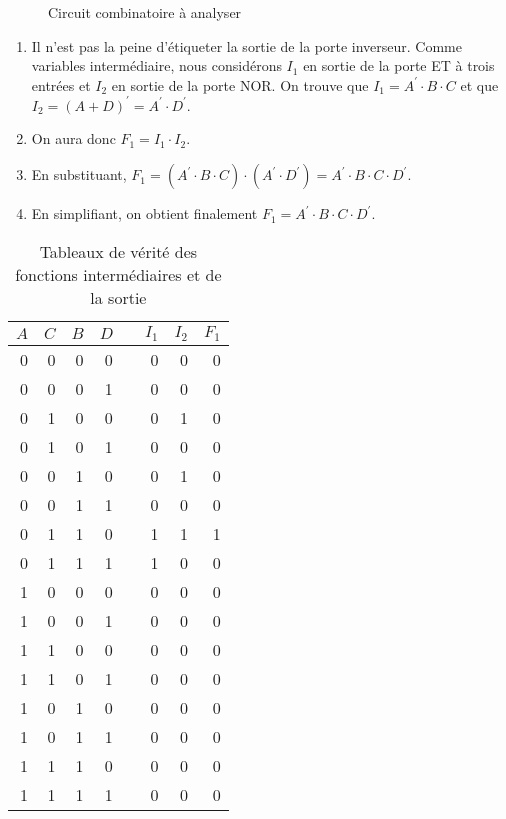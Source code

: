 \documentclass[11pt]{article}
\begin{document}
\begin{figure}[htbp]
\centering

\caption{\label{fig:org4205ee8}Circuit combinatoire à analyser}
\end{figure}

\begin{enumerate}
\item Il n'est pas la peine d'étiqueter la sortie de la porte
inverseur. Comme variables intermédiaire, nous considérons \(I_1\)
en sortie de la porte ET à trois entrées et \(I_2\) en sortie de la
porte NOR. On trouve que \(I_1 = A^\prime \cdot B \cdot C\) et que
\(I_2 = (A + D)^\prime = A^\prime \cdot D^\prime\).

\item On aura donc \(F_1 = I_1 \cdot I_2\).

\item En substituant, \(F_1 = ( A^\prime \cdot B \cdot C ) \cdot (
   A^\prime \cdot D^\prime) = A^\prime \cdot B \cdot C \cdot
   D^\prime\).

\item En simplifiant, on obtient finalement \(F_1 = A^\prime \cdot B
   \cdot C \cdot D^\prime\).
\end{enumerate}

\begin{table}[htbp]
\caption{\label{tab:orge8c49b7}Tableaux de vérité des fonctions intermédiaires et de la sortie}
\centering
\begin{tabular}{rrrrlrrr}
\(A\) & \(C\) & \(B\) & \(D\) &  & \(I_1\) & \(I_2\) & \(F_1\)\\
\hline
0 & 0 & 0 & 0 &  & 0 & 0 & 0\\
0 & 0 & 0 & 1 &  & 0 & 0 & 0\\
0 & 1 & 0 & 0 &  & 0 & 1 & 0\\
0 & 1 & 0 & 1 &  & 0 & 0 & 0\\
0 & 0 & 1 & 0 &  & 0 & 1 & 0\\
0 & 0 & 1 & 1 &  & 0 & 0 & 0\\
0 & 1 & 1 & 0 &  & 1 & 1 & 1\\
0 & 1 & 1 & 1 &  & 1 & 0 & 0\\
1 & 0 & 0 & 0 &  & 0 & 0 & 0\\
1 & 0 & 0 & 1 &  & 0 & 0 & 0\\
1 & 1 & 0 & 0 &  & 0 & 0 & 0\\
1 & 1 & 0 & 1 &  & 0 & 0 & 0\\
1 & 0 & 1 & 0 &  & 0 & 0 & 0\\
1 & 0 & 1 & 1 &  & 0 & 0 & 0\\
1 & 1 & 1 & 0 &  & 0 & 0 & 0\\
1 & 1 & 1 & 1 &  & 0 & 0 & 0\\
\end{tabular}
\end{table}
\end{document}
